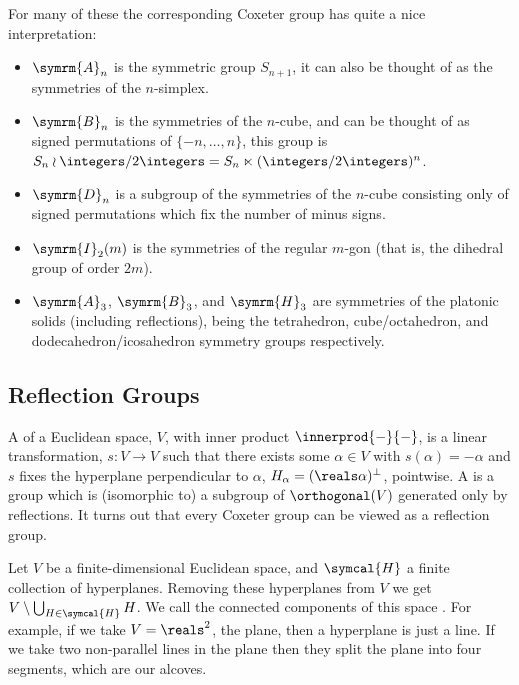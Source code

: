 \documentclass[fleqn]{NotesClass}
\newcommand{\dynkin}[2]{\symrm{#1}_{#2}}
\begin{document}
    For many of these the corresponding Coxeter group has quite a nice interpretation:
    \begin{itemize}
        \item \(\dynkin{A}{n}\) is the symmetric group \(S_{n + 1}\), it can also be thought of as the symmetries of the \(n\)-simplex.
        \item \(\dynkin{B}{n}\) is the symmetries of the \(n\)-cube, and can be thought of as signed permutations of \(\{-n, \dotsc, n\}\), this group is \(S_n \wr \integers/2\integers = S_n \ltimes (\integers/2\integers)^n\).
        \item \(\dynkin{D}{n}\) is a subgroup of the symmetries of the \(n\)-cube consisting only of signed permutations which fix the number of minus signs.
        \item \(\dynkin{I}{2}(m)\) is the symmetries of the regular \(m\)-gon (that is, the dihedral group of order \(2m\)).
        \item \(\dynkin{A}{3}\), \(\dynkin{B}{3}\), and \(\dynkin{H}{3}\) are symmetries of the platonic solids (including reflections), being the tetrahedron, cube/octahedron, and dodecahedron/icosahedron symmetry groups respectively.
    \end{itemize}
    
    \subsection{Reflection Groups}
    A  of a Euclidean space, \(V\), with inner product \(\innerprod{-}{-}\), is a linear transformation, \(s \colon V \to V\) such that there exists some \(\alpha \in V\) with \(s(\alpha) = -\alpha\) and \(s\) fixes the hyperplane perpendicular to \(\alpha\), \(H_\alpha = (\reals\alpha)^{\perp}\), pointwise.
    A  is a group which is (isomorphic to) a subgroup of \(\orthogonal(V)\) generated only by reflections.
    It turns out that every Coxeter group can be viewed as a reflection group.
    
    Let \(V\) be a finite-dimensional Euclidean space, and \(\symcal{H}\) a finite collection of hyperplanes.
    Removing these hyperplanes from \(V\) we get \(V \setminus \bigcup_{H \in \symcal{H}}H\).
    We call the connected components of this space .
    For example, if we take \(V = \reals^2\), the plane, then a hyperplane is just a line.
    If we take two non-parallel lines in the plane then they split the plane into four segments, which are our alcoves.
    
\end{document}
